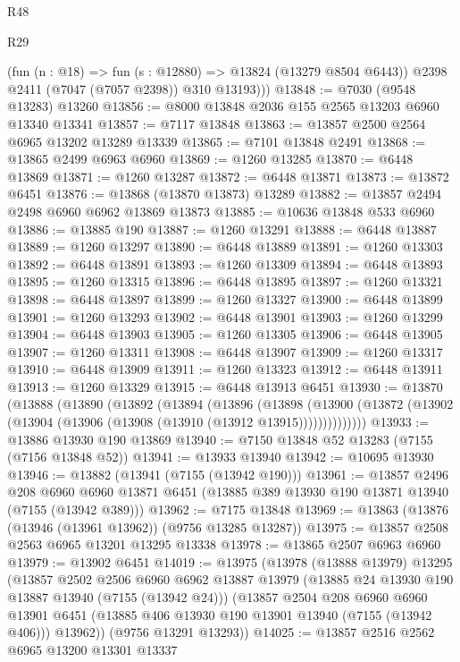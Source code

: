 \begin{lexlean}{R48}
\begin{lexlean}{R29}
\begin{coremodule}
{{{{{{{{{{{{{{{{{{{{{{{{{{{{{{{{{{{{{{{{{{{{{{{{{{{{{{{{{{{{{{{{{{{{{{{{{{{{{{{{{{{{{{{{{{{{{{{{{{{{{{{{{{{{{{{{{{{{{{{{{{{{{{{{{{{{{{{{{{{{{{{{{{{{{{{{{{{{{{{{{{{{{{{{{{{{{{{{{{{{{{{{{{{{{{{{{{{{{{{{{{{{{{{{{{{{{{{{{{          (fun (n : @18) => fun (s : @12880) => @13824 (@13279 @8504 @6443))
          @2398
          @2411
          (@7047 (@7057 @2398))
          @310
          @13193)))
@13848 := @7030 (@9548 @13283) @13260
@13856 := @8000 @13848 @2036 @155 @2565 @13203 @6960 @13340 @13341
@13857 := @7117 @13848
@13863 := @13857 @2500 @2564 @6965 @13202 @13289 @13339
@13865 := @7101 @13848 @2491
@13868 := @13865 @2499 @6963 @6960
@13869 := @1260 @13285
@13870 := @6448 @13869
@13871 := @1260 @13287
@13872 := @6448 @13871
@13873 := @13872 @6451
@13876 := @13868 (@13870 @13873) @13289
@13882 := @13857 @2494 @2498 @6960 @6962 @13869 @13873
@13885 := @10636 @13848 @533 @6960
@13886 := @13885 @190
@13887 := @1260 @13291
@13888 := @6448 @13887
@13889 := @1260 @13297
@13890 := @6448 @13889
@13891 := @1260 @13303
@13892 := @6448 @13891
@13893 := @1260 @13309
@13894 := @6448 @13893
@13895 := @1260 @13315
@13896 := @6448 @13895
@13897 := @1260 @13321
@13898 := @6448 @13897
@13899 := @1260 @13327
@13900 := @6448 @13899
@13901 := @1260 @13293
@13902 := @6448 @13901
@13903 := @1260 @13299
@13904 := @6448 @13903
@13905 := @1260 @13305
@13906 := @6448 @13905
@13907 := @1260 @13311
@13908 := @6448 @13907
@13909 := @1260 @13317
@13910 := @6448 @13909
@13911 := @1260 @13323
@13912 := @6448 @13911
@13913 := @1260 @13329
@13915 := @6448 @13913 @6451
@13930 := @13870
    (@13888
      (@13890
        (@13892
          (@13894
            (@13896
              (@13898
                (@13900 (@13872 (@13902 (@13904 (@13906 (@13908 (@13910 (@13912 @13915))))))))))))))
@13933 := @13886 @13930 @190 @13869
@13940 := @7150 @13848 @52 @13283 (@7155 (@7156 @13848 @52))
@13941 := @13933 @13940
@13942 := @10695 @13930
@13946 := @13882 (@13941 (@7155 (@13942 @190)))
@13961 := @13857
    @2496
    @208
    @6960
    @6960
    @13871
    @6451
    (@13885 @389 @13930 @190 @13871 @13940 (@7155 (@13942 @389)))
@13962 := @7175 @13848
@13969 := @13863 (@13876 (@13946 (@13961 @13962)) (@9756 @13285 @13287))
@13975 := @13857 @2508 @2563 @6965 @13201 @13295 @13338
@13978 := @13865 @2507 @6963 @6960
@13979 := @13902 @6451
@14019 := @13975
    (@13978
      (@13888 @13979)
      @13295
      (@13857
        @2502
        @2506
        @6960
        @6962
        @13887
        @13979
        (@13885 @24 @13930 @190 @13887 @13940 (@7155 (@13942 @24)))
        (@13857
          @2504
          @208
          @6960
          @6960
          @13901
          @6451
          (@13885 @406 @13930 @190 @13901 @13940 (@7155 (@13942 @406)))
          @13962))
      (@9756 @13291 @13293))
@14025 := @13857 @2516 @2562 @6965 @13200 @13301 @13337
}}}}}}}}}}}}}}}}}}}}}}}}}}}}}}}}}}}}}}}}}}}}}}}}}}}}}}}}}}}}}}}}}}}}}}}}}}}}}}}}}}}}}}}}}}}}}}}}}}}}}}}}}}}}}}}}}}}}}}}}}}}}}}}}}}}}}}}}}}}}}}}}}}}}}}}}}}}}}}}}}}}}}}}}}}}}}}}}}}}}}}}}}}}}}}}}}}}}}}}}}}}}}}}}}}}}}}}}}}
\end{coremodule}
\end{lexlean}
\end{lexlean}
